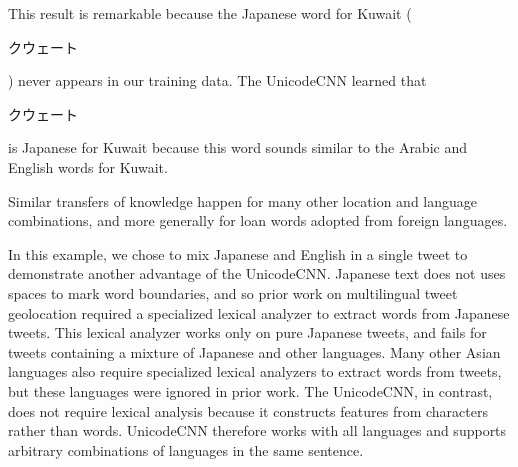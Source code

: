 \documentclass[sigconf,10pt]{acmart}
\newcommand{\defn}[1]{\textit{#1}}
\newcommand{\ignore}[1]{}
\newcommand{\fixme}[1]{\textcolor{red}{\textbf{FIXME:} {#1}}}
\begin{document}
\begin{description}
\noindent

\noindent
This result is remarkable because the Japanese word for Kuwait (\begin{CJK}{UTF8}{min}クウェート\end{CJK}) never appears in our training data.
The UnicodeCNN learned that \begin{CJK}{UTF8}{min}クウェート\end{CJK} is Japanese for Kuwait because this word sounds similar to the Arabic and English words for Kuwait.
    \ignore{
Furthermore, if we misspell the Japanese word for Kuwait (for example as \begin{CJK}{UTF8}{min}ウェート\end{CJK}),
then the UnicodeCNN still understands that the location referred to is Kuwait.
The model's output in this case is
\noindent
}
\noindent
Similar transfers of knowledge happen for many other location and language combinations,
and more generally for loan words adopted from foreign languages.

In this example, we chose to mix Japanese and English in a single tweet to demonstrate another advantage of the UnicodeCNN.
Japanese text does not uses spaces to mark word boundaries, 
and so prior work on multilingual tweet geolocation \citep{han2014text} required a specialized lexical analyzer to extract words from Japanese tweets.
This lexical analyzer works only on pure Japanese tweets,
and fails for tweets containing a mixture of Japanese and other languages.
Many other Asian languages also require specialized lexical analyzers to extract words from tweets,
but these languages were ignored in prior work.
The UnicodeCNN, in contrast, does not require lexical analysis because it constructs features from characters rather than words.
UnicodeCNN therefore works with all languages and supports arbitrary combinations of languages in the same sentence.


\end{description}
\end{document}
